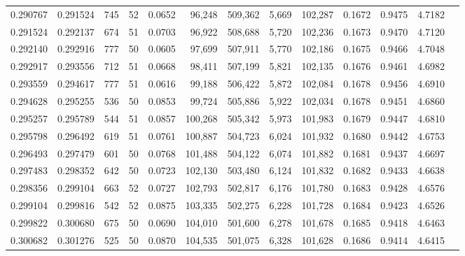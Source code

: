 \begin{tabular}{rrrrrrrrrrrrr}
0.290767 & 0.291524 &   745 &  52 &                                     0.0652 &  96,248 & 509,362 &   5,669 & 102,287 & 0.1672 & 0.9475 & 4.7182 \\
0.291524 & 0.292137 &   674 &  51 &                                     0.0703 &  96,922 & 508,688 &   5,720 & 102,236 & 0.1673 & 0.9470 & 4.7120 \\
0.292140 & 0.292916 &   777 &  50 &                                     0.0605 &  97,699 & 507,911 &   5,770 & 102,186 & 0.1675 & 0.9466 & 4.7048 \\
0.292917 & 0.293556 &   712 &  51 &                                     0.0668 &  98,411 & 507,199 &   5,821 & 102,135 & 0.1676 & 0.9461 & 4.6982 \\
0.293559 & 0.294617 &   777 &  51 &                                     0.0616 &  99,188 & 506,422 &   5,872 & 102,084 & 0.1678 & 0.9456 & 4.6910 \\
0.294628 & 0.295255 &   536 &  50 &                                     0.0853 &  99,724 & 505,886 &   5,922 & 102,034 & 0.1678 & 0.9451 & 4.6860 \\
0.295257 & 0.295789 &   544 &  51 &                                     0.0857 & 100,268 & 505,342 &   5,973 & 101,983 & 0.1679 & 0.9447 & 4.6810 \\
0.295798 & 0.296492 &   619 &  51 &                                     0.0761 & 100,887 & 504,723 &   6,024 & 101,932 & 0.1680 & 0.9442 & 4.6753 \\
0.296493 & 0.297479 &   601 &  50 &                                     0.0768 & 101,488 & 504,122 &   6,074 & 101,882 & 0.1681 & 0.9437 & 4.6697 \\
0.297483 & 0.298352 &   642 &  50 &                                     0.0723 & 102,130 & 503,480 &   6,124 & 101,832 & 0.1682 & 0.9433 & 4.6638 \\
0.298356 & 0.299104 &   663 &  52 &                                     0.0727 & 102,793 & 502,817 &   6,176 & 101,780 & 0.1683 & 0.9428 & 4.6576 \\
0.299104 & 0.299816 &   542 &  52 &                                     0.0875 & 103,335 & 502,275 &   6,228 & 101,728 & 0.1684 & 0.9423 & 4.6526 \\
0.299822 & 0.300680 &   675 &  50 &                                     0.0690 & 104,010 & 501,600 &   6,278 & 101,678 & 0.1685 & 0.9418 & 4.6463 \\
0.300682 & 0.301276 &   525 &  50 &                                     0.0870 & 104,535 & 501,075 &   6,328 & 101,628 & 0.1686 & 0.9414 & 4.6415 \\

\end{tabular}
